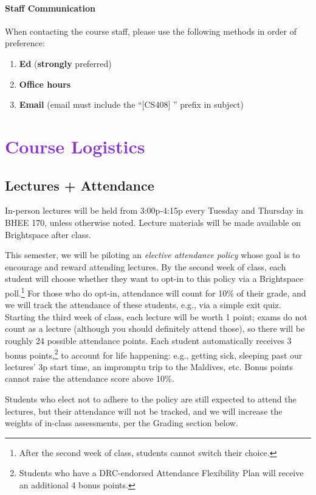 \documentclass[letterpaper,11pt]{article}
\begin{document}
\paragraph{Staff Communication}
When contacting the course staff, please use the following methods in
order of preference:
\begin{enumerate}
\item \textbf{Ed} (\textbf{strongly} preferred)
\item \textbf{Office hours}
\item \textbf{Email} (email must include the ``[CS408] '' prefix in subject)
\end{enumerate}

\section*{\textcolor{BlueViolet}{Course Logistics}}

\subsection*{Lectures + Attendance}

In-person lectures will be held from 3:00p-4:15p every Tuesday and
Thursday in BHEE 170, unless otherwise noted. Lecture materials will
be made available on Brightspace after class.

This semester, we will be piloting an \emph{elective attendance
  policy} whose goal is to encourage and reward attending lectures. By
the second week of class, each student will choose whether they want
to opt-in to this policy via a Brightspace poll.\footnote{After the
  second week of class, students cannot switch their choice.} For
those who do opt-in, attendance will count for 10\% of their grade,
and we will track the attendance of these students, e.g., via a simple
exit quiz. Starting the third week of class, each lecture will be
worth 1 point; exams do not count as a lecture (although you should
definitely attend those), so there will be roughly 24 possible
attendance points. Each student automatically receives 3 bonus
points,\footnote{Students who have a DRC-endorsed Attendance
  Flexibility Plan will receive an additional 4 bonus points.} to
account for life happening: e.g., getting sick, sleeping past our
lectures' 3p start time, an impromptu trip to the Maldives, etc. Bonus
points cannot raise the attendance score above 10\%.

Students who elect not to adhere to the policy are still expected to
attend the lectures, but their attendance will not be tracked, and we
will increase the weights of in-class assessments, per the Grading
section below.
\end{document}
